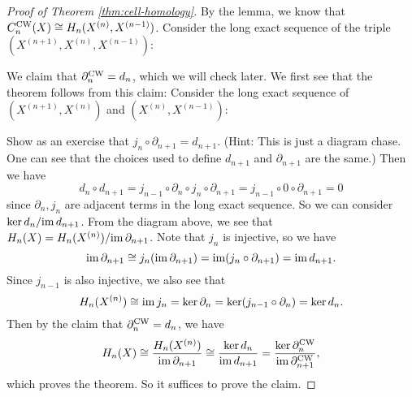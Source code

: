\begin{proof}[Proof of Theorem \ref{thm:cell-homology}]
  By the lemma, we know that
  $C_n^{\mathrm{CW}}(X) \cong H_n(X^{(n)}, X^{(n - 1)})$.
  Consider the long exact sequence of the
  triple $(X^{(n + 1)}, X^{(n)}, X^{(n - 1)})$:
  \begin{center}
  \end{center}
  We claim that $\partial_n^{\mathrm{CW}} = d_{n}$, which
  we will check later. We first see that the
  theorem follows from this claim: Consider the
  long exact sequence of $(X^{(n + 1)}, X^{(n)})$
  and $(X^{(n)}, X^{(n - 1)})$:
  \begin{center}
  \end{center}
  Show as an exercise that $j_n \circ \partial_{n + 1} = d_{n + 1}$.
  (Hint: This is just a diagram chase. One can see
  that the choices used to define $d_{n + 1}$ and
  $\partial_{n + 1}$ are the same.)
  Then we have
  \[
    d_n \circ d_{n + 1} = j_{n - 1} \circ \partial_n \circ j_n \circ \partial_{n + 1}
    = j_{n - 1} \circ 0 \circ \partial_{n + 1} = 0
  \]
  since $\partial_n, j_n$ are adjacent terms in
  the long exact sequence.
  So we can consider $\ker d_n / {\operatorname{im} d_{n + 1}}$.
  From the diagram above, we see
  that
  $H_n(X) = H_n(X^{(n)}) / {\operatorname{im} \partial_{n + 1}}$.
  Note that $j_n$ is injective, so we have
  \[
    \operatorname{im} \partial_{n + 1}
    \cong j_n (\operatorname{im} \partial_{n + 1})
    = \operatorname{im} (j_n \circ \partial_{n + 1})
    = \operatorname{im} d_{n + 1}.
  \]
  Since $j_{n - 1}$ is also injective, we also see that
  \[
    H_n(X^{(n)})
    \cong \operatorname{im} j_n = \ker \partial_n
    = \ker (j_{n - 1} \circ \partial_n)
    = \ker d_n.
  \]
  Then by the claim that
  $\partial_n^{\mathrm{CW}} = d_{n}$, we have
  \[
    H_n(X) \cong \frac{H_n(X^{(n)})}{\operatorname{im} \partial_{n + 1}}
    \cong \frac{\ker d_n}{\operatorname{im} d_{n + 1}}
    = \frac{\ker \partial_n^{\mathrm{CW}}}{\operatorname{im} \partial_{n + 1}^{\mathrm{CW}}},
  \]
  which proves the theorem. So it suffices
  to prove the claim.


\end{proof}
